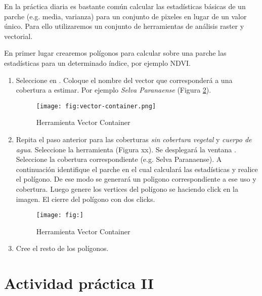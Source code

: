 En la práctica diaria es bastante común calcular las estadísticas básicas de un parche (e.g. media, varianza) para un conjunto de pixeles en lugar de un valor único. Para ello utilizaremos un conjunto de herramientas de análisis raster y vectorial.%

En primer lugar crearemos polígonos para calcular sobre una parche las estadísticas para un determinado índice, por ejemplo NDVI. 

\begin{enumerate}
\item Seleccione en . Coloque el nombre del vector que corresponderá a una cobertura a estimar. Por ejemplo \emph{Selva Paranaense} (Figura \ref{fig:vector-container}).

\begin{figure}[h!]
    \centering
    \texttt{[image: fig:vector-container.png]}
    \caption{Herramienta Vector Container}
    \label{fig:vector-container}
\end{figure}

 
\item Repita el paso anterior para las coberturas \emph{sin cobertura vegetal} y \emph {cuerpo de agua}. Seleccione la herramienta  (Figura xx). Se desplegará la ventana . Seleccione la cobertura correspondiente (e.g. Selva Paranaense). A continuación identifique el parche en el cual calculará las estadísticas y realice el polígono. De ese modo se generará un poligono correspondiente a ese uso y cobertura. Luego genere los vertices del polígono se haciendo click en la imagen. El cierre del polígono con dos clicks.

\begin{figure}[h!]
    \centering
    \texttt{[image: fig:]}
    \caption{Herramienta Vector Container}
    \label{fig:vector-container}
\end{figure}

\item Cree el resto de los polígonos.
\end{enumerate}  

%






\section{Actividad práctica II}


